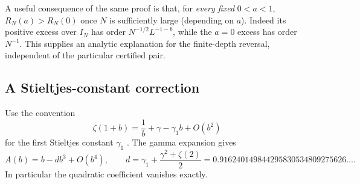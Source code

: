 \documentclass[11pt]{article}
\numberwithin{equation}{section}
\theoremstyle{definition}\newtheorem{definition}[theorem]{Definition}
\theoremstyle{remark}\newtheorem{remark}[theorem]{Remark}
\begin{document}
A useful consequence of the same proof is that, for \emph{every fixed}
$0<a<1$, $R_N(a)>R_N(0)$ once $N$ is sufficiently large (depending on
$a$). Indeed its positive excess over $I_N$ has order
$N^{-1/2}L^{-1-b}$, while the $a=0$ excess has order $N^{-1}$.
This supplies an analytic explanation for the finite-depth reversal,
independent of the particular certified pair.

\subsection{A Stieltjes-constant correction}
Use the convention
\[
 \zeta(1+b)=\frac1b+\gamma-\gamma_1b+O(b^2)
\]
for the first Stieltjes constant $\gamma_1$ \cite{dlmf-zeta}.
The gamma expansion \cite{dlmf-gamma} gives
\begin{equation}\label{eq:Acubic}
 A(b)=b-db^3+O(b^4),\qquad
 d=\gamma_1+\frac{\gamma^2+\zeta(2)}2
 =0.916240149844295830534809275626\ldots.
\end{equation}
In particular the quadratic coefficient vanishes exactly.
\end{document}

